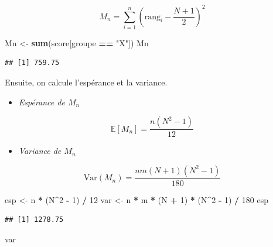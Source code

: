 \documentclass[
  12pt,
]{article}
\newenvironment{Shaded}{\begin{snugshade}}{\end{snugshade}}
\newcommand{\DecValTok}[1]{\textcolor[rgb]{0.00,0.00,0.81}{#1}}
\newcommand{\FunctionTok}[1]{\textcolor[rgb]{0.13,0.29,0.53}{\textbf{#1}}}
\newcommand{\NormalTok}[1]{#1}
\newcommand{\OtherTok}[1]{\textcolor[rgb]{0.56,0.35,0.01}{#1}}
\newcommand{\SpecialCharTok}[1]{\textcolor[rgb]{0.81,0.36,0.00}{\textbf{#1}}}
\newcommand{\StringTok}[1]{\textcolor[rgb]{0.31,0.60,0.02}{#1}}
\providecommand{\tightlist}{%
  \setlength{\itemsep}{0pt}\setlength{\parskip}{0pt}}
\begin{document}
\[
M_n = \sum_{i=1}^n \left( \text{rang}_i - \frac{N + 1}{2} \right)^2
\]

\begin{Shaded}
\begin{Highlighting}[]
\NormalTok{Mn }\OtherTok{\textless{}{-}} \FunctionTok{sum}\NormalTok{(score[groupe }\SpecialCharTok{==} \StringTok{"X"}\NormalTok{])}
\NormalTok{Mn}
\end{Highlighting}
\end{Shaded}

\begin{verbatim}
## [1] 759.75
\end{verbatim}

Ensuite, on calcule l'espérance et la variance.

\begin{itemize}
\tightlist
\item
  \emph{Espérance de \(M_n\)}
\end{itemize}

\[
\mathbb{E}[M_n] = \frac{n (N^2 - 1)}{12}
\]

\begin{itemize}
\tightlist
\item
  \emph{Variance de \(M_n\)}
\end{itemize}

\[
\mathrm{Var}(M_n) = \frac{n m (N + 1)(N^2 - 1)}{180}
\]

\begin{Shaded}
\begin{Highlighting}[]
\NormalTok{esp }\OtherTok{\textless{}{-}}\NormalTok{ n }\SpecialCharTok{*}\NormalTok{ (N}\SpecialCharTok{\^{}}\DecValTok{2} \SpecialCharTok{{-}} \DecValTok{1}\NormalTok{) }\SpecialCharTok{/} \DecValTok{12}
\NormalTok{var }\OtherTok{\textless{}{-}}\NormalTok{ n }\SpecialCharTok{*}\NormalTok{ m }\SpecialCharTok{*}\NormalTok{ (N }\SpecialCharTok{+} \DecValTok{1}\NormalTok{) }\SpecialCharTok{*}\NormalTok{ (N}\SpecialCharTok{\^{}}\DecValTok{2} \SpecialCharTok{{-}} \DecValTok{1}\NormalTok{) }\SpecialCharTok{/} \DecValTok{180}
\NormalTok{esp}
\end{Highlighting}
\end{Shaded}

\begin{verbatim}
## [1] 1278.75
\end{verbatim}

\begin{Shaded}
\begin{Highlighting}[]
\NormalTok{var}
\end{Highlighting}
\end{Shaded}
\end{document}
